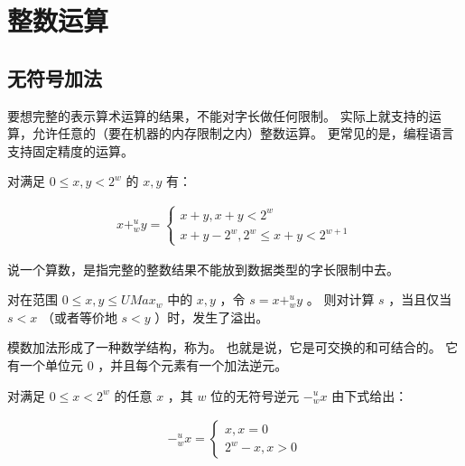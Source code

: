
\section{整数运算}
{
    \subsection{无符号加法}
    {
        要想完整的表示算术运算的结果，不能对字长做任何限制。
        实际上就支持的运算，允许任意的（要在机器的内存限制之内）整数运算。
        更常见的是，编程语言支持固定精度的运算。

        \begin{defines}[无符号数加法]
            对满足 $0 \leq x, y < 2^w$ 的 $x, y$ 有：

            \begin{align}
                x +_w^u y =
                \begin{cases}
                    x + y, x + y < 2^w
                    \\
                    x + y - 2^w, 2^w \leq x + y < 2^{w + 1}
                \end{cases}
            \end{align}
        \end{defines}

        说一个算数，是指完整的整数结果不能放到数据类型的字长限制中去。

        \begin{defines}[检测无符号数加法中的溢出]
            对在范围 $0 \leq x, y \leq UMax_w$ 中的 $x, y$ ，令 $s = x +_w^u y$ 。
            则对计算 $s$ ，当且仅当 $s < x$ （或者等价地 $s < y$ ）时，发生了溢出。
        \end{defines}

        \begin{practicec}

        \end{practicec}

        模数加法形成了一种数学结构，称为。
        也就是说，它是可交换的和可结合的。
        它有一个单位元 $0$ ，并且每个元素有一个加法逆元。

        \begin{defines}[无符号数求反]
            对满足 $0 \leq x < 2^w$ 的任意 $x$ ，其 $w$ 位的无符号逆元 $-_w^ux$ 由下式给出：

            \begin{align}
                -_w^u x =
                \begin{cases}
                    x, x = 0
                    \\
                    2^w - x, x > 0
                \end{cases}
            \end{align}
        \end{defines}

}}

